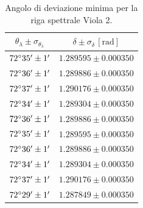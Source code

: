 \documentclass[]{article}
\begin{document}
    \begin{table}[H]
        \centering
        \begin{tabular}{||c|c||}
            \hline
            $\theta_{\lambda} \pm \sigma_{\theta_{\lambda}}$ & $\delta \pm \sigma_{\delta} \,\left[\text{rad}\right]$ \\\hline
            \hline
            $72\degree 35' \pm 1'$ & $1.289595 \pm 0.000350$ \\\hline
            $72\degree 36' \pm 1'$ & $1.289886 \pm 0.000350$ \\\hline
            $72\degree 37' \pm 1'$ & $1.290176 \pm 0.000350$ \\\hline
            $72\degree 34' \pm 1'$ & $1.289304 \pm 0.000350$ \\\hline
            $72\degree 36' \pm 1'$ & $1.289886 \pm 0.000350$ \\\hline
            $72\degree 35' \pm 1'$ & $1.289595 \pm 0.000350$ \\\hline
            $72\degree 36' \pm 1'$ & $1.289886 \pm 0.000350$ \\\hline
            $72\degree 34' \pm 1'$ & $1.289304 \pm 0.000350$ \\\hline
            $72\degree 37' \pm 1'$ & $1.290176 \pm 0.000350$ \\\hline
            $72\degree 29' \pm 1'$ & $1.287849 \pm 0.000350$ \\\hline
        \end{tabular}
        \caption{Angolo di deviazione minima per la riga spettrale Viola 2.}
        \label{viola-2}
    \end{table}
\end{document}
